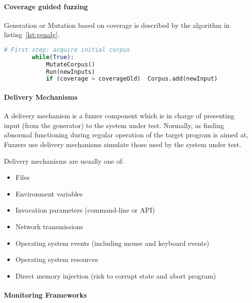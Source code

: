 \paragraph{Coverage guided fuzzing}

Generation or Mutation based on coverage is described by the algorithm in listing~\ref{lst:genalg}.



\begin{lstlisting}[caption={Coverage based data generation}, label={lst:genalg}, language=python]
    # First step: acquire initial corpus
        while(True):
            MutateCorpus()
            Run(newInputs)
            if (coverage > coverageOld)  Corpus.add(newInput)

\end{lstlisting}


\paragraph{Delivery Mechanisms}

A delivery mechanism is a fuzzer component which is in charge of presenting input (from the generator)
to the system under test. Normally, as finding abnormal functioning during regular operation of the
target program is aimed at, Fuzzers use delivery mechanisms simulate those used by the system under test\cite{mcnallyFuzzingStateArt2012}.

Delivery mechanisms are usually one of:

\begin{itemize}
    \item Files
    \item Environment variables
    \item Invocation parameters (command-line or API)
    \item Network transmissions
    \item Operating system events (including mouse and keyboard events)
    \item Operating system resources
    \item Direct memory injection (risk to corrupt state and abort program)
\end{itemize}


\paragraph{Monitoring Frameworks}

